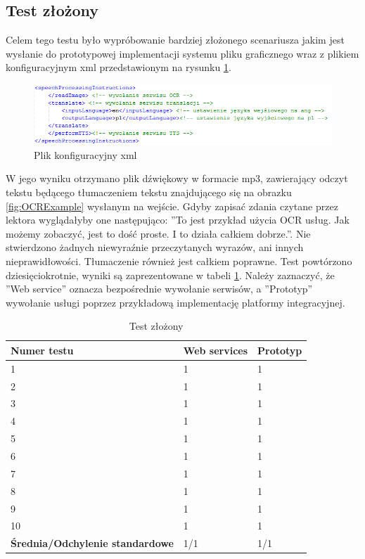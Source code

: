 \subsection{Test złożony}
Celem tego testu było wypróbowanie bardziej złożonego scenariusza jakim jest wysłanie do prototypowej implementacji systemu pliku graficznego wraz z plikiem konfiguracyjnym xml przedstawionym na rysunku \ref{fig:xmlConf}.
\begin{figure}[!h]
\centering
\includegraphics[scale=0.9]{xmlConf.png}
\caption{Plik konfiguracyjny xml}\label{fig:xmlConf}
\end{figure}
W jego wyniku otrzymano plik dźwiękowy w formacie mp3, zawierający odczyt tekstu będącego tłumaczeniem tekstu znajdującego się na obrazku \ref{fig:OCRExample} wysłanym na wejście. Gdyby zapisać zdania czytane przez lektora wyglądałyby one następująco: ''To jest przykład użycia OCR usług. Jak możemy zobaczyć, jest to dość proste. I to działa całkiem dobrze.''. Nie stwierdzono żadnych niewyraźnie przeczytanych wyrazów, ani innych nieprawidłowości. Tłumaczenie również jest całkiem poprawne. Test powtórzono dziesięciokrotnie, wyniki są zaprezentowane w tabeli \ref{tab:bigTest}. Należy zaznaczyć, że ''Web service'' oznacza bezpośrednie wywołanie serwisów, a ''Prototyp'' wywołanie usługi poprzez przykładową implementację platformy integracyjnej.
\begin{center}
	\begin{table}[t]
	\label{tab:bigTest}
	\caption{Test złożony}
	\centering
	\begin{tabular}{| l | l | l |}	
		\hline
		\textbf{Numer testu} & \textbf{Web services} & \textbf{Prototyp} \\ \hline
		1 & 1 & 1\\ \hline
		2 & 1 & 1\\ \hline
		3 & 1 & 1\\ \hline
		4 & 1 & 1\\ \hline
		5 & 1 & 1\\ \hline
		6 & 1 & 1\\ \hline
		7 & 1 & 1\\ \hline
		8 & 1 & 1\\ \hline
		9 & 1 & 1\\ \hline
		10 & 1 & 1\\ \hline
		\textbf{Średnia/Odchylenie standardowe} & 1/1 & 1/1\\ 
		\hline
	\end{tabular}
	\end{table}
\end{center}
